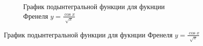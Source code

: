 \documentclass[12pt, a4paper]{article}
\begin{document}
\begin{figure}[H]
\begin{minipage}[t]{.4\textwidth}
\begin{figure}[H]
  \caption{График подынтегральной функции для фукнции Френеля $y =  \frac{\cos{x}}{\sqrt{x}}$}
  \label{fig:fren2_fun}
    \end{figure}
\end{minipage}
\end{figure}
\end{document}

